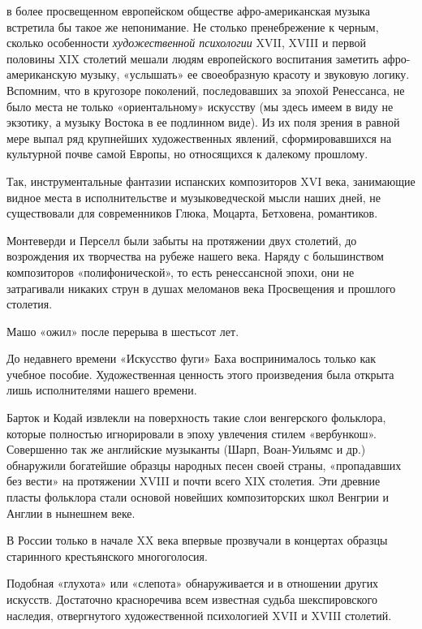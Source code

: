 в  более просвещенном  европейском  обществе афро-американская  музыка
встретила бы такое же непонимание.  Не столько пренебрежение к черным,
сколько  особенности \emph{художественной  психологии}  XVII, XVIII  и
первой  половины XIX  столетий  мешали  людям европейского  воспитания
заметить афро-американскую музыку,  «услышать» ее своеобразную красоту
и звуковую логику. Вспомним,  что в кругозоре поколений, последовавших
за  эпохой  Ренессанса,  не   было  места  не  только  «ориентальному»
искусству (мы  здесь имеем в виду  не экзотику, а музыку  Востока в ее
подлинном виде). Из их поля зрения  в равной мере выпал ряд крупнейших
художественных  явлений, сформировавшихся  на  культурной почве  самой
Европы, но относящихся к далекому прошлому.

Так,  инструментальные  фантазии   испанских  композиторов  XVI  века,
занимающие  видное места  в  исполнительстве  и музыковедческой  мысли
наших  дней,   не  существовали  для  современников   Глюка,  Моцарта,
Бетховена, романтиков.

Монтеверди  и Перселл  были  забыты на  протяжении  двух столетий,  до
возрождения их творчества на рубеже нашего века. Наряду с большинством
композиторов  «полифонической», то  есть  ренессансной  эпохи, они  не
затрагивали  никаких  струн  в  душах  меломанов  века  Просвещения  и
прошлого столетия.

Машо «ожил» после перерыва в шестьсот лет.

До недавнего  времени «Искусство фуги» Баха  воспринималось только как
учебное  пособие.  Художественная  ценность  этого  произведения  была
открыта лишь исполнителями нашего времени.

Барток  и  Кодай  извлекли   на  поверхность  такие  слои  венгерского
фольклора,   которые   полностью   игнорировали  в   эпоху   увлечения
стилем  «вербункош». Совершенно  так  же  английские музыканты  (Шарп,
Воан-Уильямс и др.) обнаружили богатейшие образцы народных песен своей
страны,  «пропадавших без  вести» на  протяжении XVIII  и почти  всего
XIX  столетия. Эти  древние  пласты фольклора  стали основой  новейших
композиторских школ Венгрии и Англии в нынешнем веке.

В  России только  в  начале  XX века  впервые  прозвучали в  концертах
образцы старинного крестьянского многоголосия.

Подобная «глухота»  или «слепота» обнаруживается и  в отношении других
искусств. Достаточно красноречива всем известная судьба шекспировского
наследия,  отвергнутого   художественной  психологией  XVII   и  XVIII
столетий.

